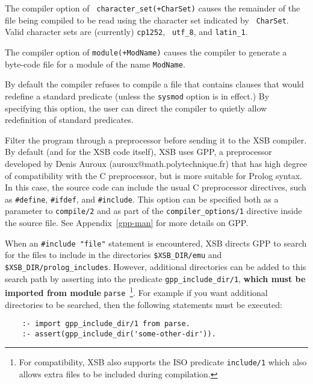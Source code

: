 \begin{description}
\item[{\tt character\_set/1}] The compiler option of {\tt
  character\_set(+CharSet)} causes the remainder of the file being
  compiled to be read using the character set indicated by {\tt
    CharSet}.  Valid character sets are (currently) {\tt cp1252}, {\tt
    utf\_8}, and {\tt latin\_1}.
%
\item[{\tt module/1}] The compiler option of {\tt module(+ModName)}
  causes the compiler to generate a byte-code file for a module of the
  name {\tt ModName}.
%
\item[{\tt allow\_redefinition}] 
	By default the compiler refuses to compile a file that
	contains clauses that would redefine a standard predicate
	(unless the {\tt sysmod} option is in effect.)  By specifying
	this option, the user can direct the compiler to quietly allow
	redefinition of standard predicates.
%
\item[{\tt xpp\_on}] Filter the program through a
  preprocessor before sending it to the XSB compiler. By default (and
  for the XSB code itself), XSB uses GPP, a preprocessor developed by
  Denis Auroux (auroux@math.polytechnique.fr) that has high degree of
  compatibility with the C preprocessor, but is more suitable for
  Prolog syntax. In this case, the source code can include the usual C
  preprocessor directives, such as \verb|#define|, \verb|#ifdef|, and
  \verb|#include|. This option can be specified both as a parameter to
       {\tt compile/2} and as part of the {\tt compiler\_options/1}
       directive inside the source file. See Appendix~\ref{gpp-man}
       for more details on GPP.

  When an \verb|#include "file"| statement is encountered, XSB directs
  GPP to search for the files to include in the
  directories \verb|$XSB_DIR/emu| and
  \verb|$XSB_DIR/prolog_includes|. 
  However, additional directories can be added to this search path by
  asserting into the predicate \verb|gpp_include_dir/1|, {\bf which
    must be imported from module} {\tt parse}~\footnote{For
    compatibility, XSB also supports the ISO predicate {\tt include/1}
    which also allows extra files to be included during compilation.}.
%  
  For example if you want additional directories to be searched, then
  the following statements must be executed:
\begin{verbatim}
    :- import gpp_include_dir/1 from parse.
    :- assert(gpp_include_dir('some-other-dir')).
\end{verbatim}


\end{description}
